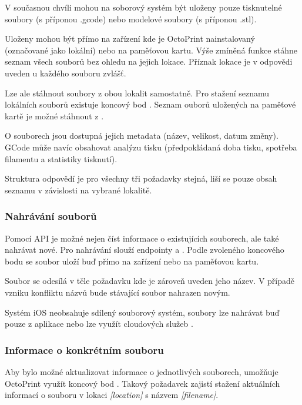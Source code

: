 V současnou chvíli mohou na soborový systém být uloženy pouze tisknutelné soubory (s příponou .gcode) nebo modelové soubory (s příponou .stl).

Uloženy mohou být přímo na zařízení kde je OctoPrint nainstalovaný (označované jako lokální) nebo na paměťovou kartu.
Výše zmíněná funkce stáhne seznam všech souborů bez ohledu na jejich lokace.
Příznak lokace je v odpovědi uveden u každého souboru zvlášť.

Lze ale stáhnout soubory z obou lokalit samostatně.
Pro stažení seznamu lokálních souborů existuje koncový bod .
Seznam ouborů uložených na paměťové kartě je možné stáhnout z .

O souborech jsou dostupná jejich metadata (název, velikost, datum změny).
GCode může navíc obsahovat analýzu tisku (předpokládaná doba tisku, spotřeba filamentu a statistiky tisknutí).

Struktura odpovědí je pro všechny tři požadavky stejná, liší se pouze obsah seznamu v závislosti na vybrané lokalitě.

\subsubsection*{Nahrávání souborů}

Pomocí API je možné nejen číst informace o existujících souborech, ale také nahrávat nové.
Pro nahrávání slouží endpointy  a .
Podle zvoleného koncového bodu se soubor uloží buď přímo na zařízení nebo na paměťovou kartu.

Soubor se odesílá v těle požadavku kde je zároveň uveden jeho název.
V případě vzniku konfliktu názvů bude stávající soubor nahrazen novým.

Systém iOS neobsahuje sdílený souborový systém, soubory lze nahrávat buď pouze z aplikace nebo lze využít cloudových služeb \cite{apple-file-system-basics}.

\subsubsection*{Informace o konkrétním souboru}

Aby bylo možné aktualizovat informace o jednotlivých souborech, umožňuje OctoPrint využít koncový bod .
Takový požadavek zajistí stažení aktuálních informací o souboru v lokaci \textit{[location]} s názvem \textit{[filename]}.

